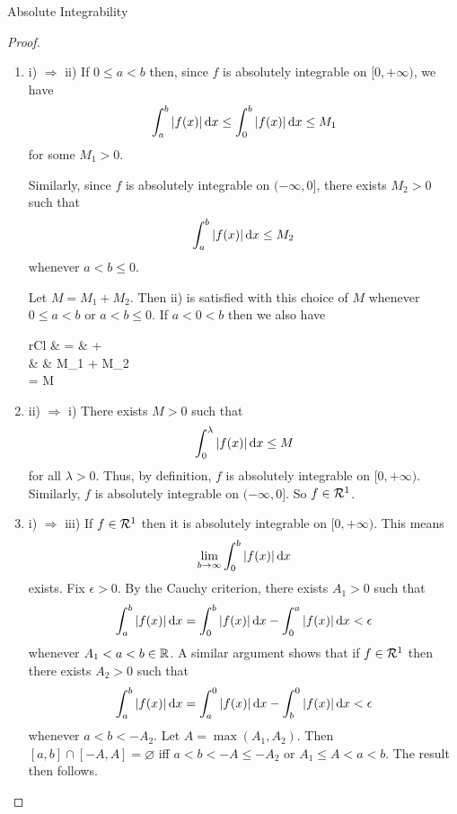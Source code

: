 \begin{section}{Absolute Integrability}
\begin{proof}
	\begin{enumerate}[]
	\item
	i) $\Rightarrow$ ii)
	If $0 \leq a < b$ then, since $f$ is absolutely
	integrable on $[0,+\infty)$, we have
		\begin{displaymath}
			\int_{a}^{b}{\left \vert {f(x)} \right \vert}\, \mathrm{d}{x}
				\leq \int_{0}^{b}{\left \vert {f(x)} \right \vert}\, \mathrm{d}{x}
				\leq M_1
		\end{displaymath}
	for some $M_1 > 0$.
	
	Similarly, since $f$ is absolutely integrable on
	$(-\infty,0]$, there exists $M_2 > 0$ such that
		\begin{displaymath}
			\int_{a}^{b}{\left \vert {f(x)} \right \vert}\, \mathrm{d}{x}
				\leq M_2
		\end{displaymath}
	whenever $a < b \leq 0$.

	Let $M = M_1 + M_2$. Then ii) is satisfied with
	this choice of $M$ whenever $0 \leq a < b$ or
	$a < b \leq 0$. If $a < 0 < b$ then we also have
		\begin{IEEEeqnarray*}{rCl}
					& = & 
					+  \\
				& \leq & M_1 + M_2 \\
				= M
		\end{IEEEeqnarray*}

	\item
	ii) $\Rightarrow$ i)
	There exists $M > 0$ such that
		\begin{displaymath}
			\int_{0}^{\lambda}{\left \vert {f(x)} \right \vert}\, \mathrm{d}{x} \leq M
		\end{displaymath}
	for all $\lambda > 0$. Thus, by definition, $f$ is
	absolutely integrable on $[0,+\infty)$. Similarly, $f$
	is absolutely integrable on $(-\infty,0]$. So $f \in
	\mathcal{R}^1$.
	
	\item
	i) $\Rightarrow$ iii)
	If $f \in \mathcal{R}^1$ then it is absolutely integrable on $[0,+\infty)$.
	This means
		\begin{displaymath}
			\lim_{b \rightarrow \infty}
				\int_{0}^{b}{\left \vert {f(x)} \right \vert}\, \mathrm{d}{x}
		\end{displaymath}
	exists. Fix $\epsilon > 0$. By the Cauchy criterion, there exists
	$A_1 > 0$ such that
		\begin{displaymath}
			\int_{a}^{b}{\left \vert {f(x)} \right \vert}\, \mathrm{d}{x} = 
				\int_{0}^{b}{\left \vert {f(x)} \right \vert}\, \mathrm{d}{x}
				- \int_{0}^{a}{\left \vert {f(x)} \right \vert}\, \mathrm{d}{x}
				< \epsilon
		\end{displaymath}
	whenever $A_1 < a < b \in \mathbb{R}$. A similar argument shows that if $f \in
	\mathcal{R}^1$ then there exists $A_2 > 0$ such that
		\begin{displaymath}
			\int_{a}^{b}{\left \vert {f(x)} \right \vert}\, \mathrm{d}{x}
				= \int_{a}^{0}{\left \vert {f(x)} \right \vert}\, \mathrm{d}{x}
				- \int_{b}^{0}{\left \vert {f(x)} \right \vert}\, \mathrm{d}{x}
				< \epsilon
		\end{displaymath}
	whenever $a < b < -A_2$. Let $A = \max (A_1, A_2)$. Then $[a,b] \cap
	[-A,A] = \varnothing$ iff $a < b < -A \leq -A_2$
	or $A_1 \leq A < a < b$. The result then follows.
	

\end{enumerate}
\end{proof}
\end{section}
